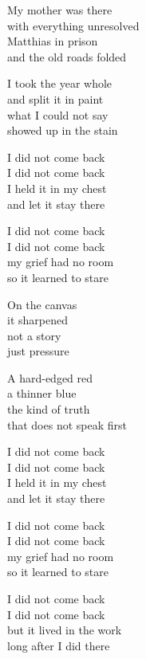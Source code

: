 \begin{lyrics}
My mother was there\\
with everything unresolved\\
Matthias in prison\\
and the old roads folded

I took the year whole\\
and split it in paint\\
what I could not say\\
showed up in the stain

I did not come back\\
I did not come back\\
I held it in my chest\\
and let it stay there

I did not come back\\
I did not come back\\
my grief had no room\\
so it learned to stare

On the canvas\\
it sharpened\\
not a story\\
just pressure

A hard-edged red\\
a thinner blue\\
the kind of truth\\
that does not speak first

I did not come back\\
I did not come back\\
I held it in my chest\\
and let it stay there

I did not come back\\
I did not come back\\
my grief had no room\\
so it learned to stare

I did not come back\\
I did not come back\\
but it lived in the work\\
long after I did there
\end{lyrics}

